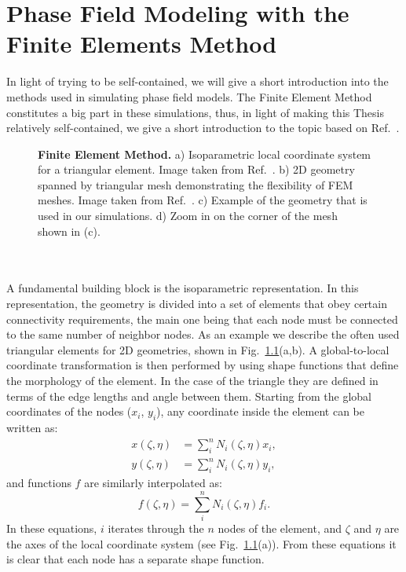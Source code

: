 \chapter{Phase Field Modeling with the Finite Elements Method \label{ch:FEM}}
In light of trying to be self-contained, we will give a short introduction into the methods used in simulating phase field models.
The Finite Element Method constitutes a big part in these simulations, thus, in light of making this Thesis relatively self-contained, we give a short introduction to the topic based on Ref.~\cite{Biner}.
\begin{figure}
	\caption{\label{fig:BTO_fem}{\bf Finite Element Method.} a) Isoparametric local coordinate system for a triangular element. Image taken from Ref.~\cite{Biner}. b) 2D geometry spanned by triangular mesh demonstrating the flexibility of FEM meshes. Image taken from Ref.~\cite{2Dmesh}. c) Example of the geometry that is used in our simulations. d) Zoom in on the corner of the mesh shown in (c).}
\end{figure}
\\\\
A fundamental building block is the isoparametric representation.
In this representation, the geometry is divided into a set of elements that obey certain connectivity requirements, the main one being that each node must be connected to the same number of neighbor nodes.
As an example we describe the often used triangular elements for 2D geometries, shown in Fig.~\ref{fig:BTO_fem}(a,b).
A global-to-local coordinate transformation is then performed by using shape functions that define the morphology of the element.
In the case of the triangle they are defined in terms of the edge lengths and angle between them. 
Starting from the global coordinates of the nodes ($x_i$, $y_i$), any coordinate inside the element can be written as:
\begin{align}
x(\zeta, \eta) &= \sum_i^n N_i(\zeta, \eta) x_i,\\
y(\zeta, \eta) &= \sum_i^n N_i(\zeta, \eta) y_i,
\end{align}
and functions $f$ are similarly interpolated as:
\begin{equation}
	\label{eq:BTO_funcinterp}
	f(\zeta, \eta) = \sum_i^n N_i(\zeta, \eta) f_i.
\end{equation}
In these equations, $i$ iterates through the $n$ nodes of the element, and $\zeta$ and $\eta$ are the axes of the local coordinate system (see Fig.~\ref{fig:BTO_fem}(a)).
From these equations it is clear that each node has a separate shape function.

